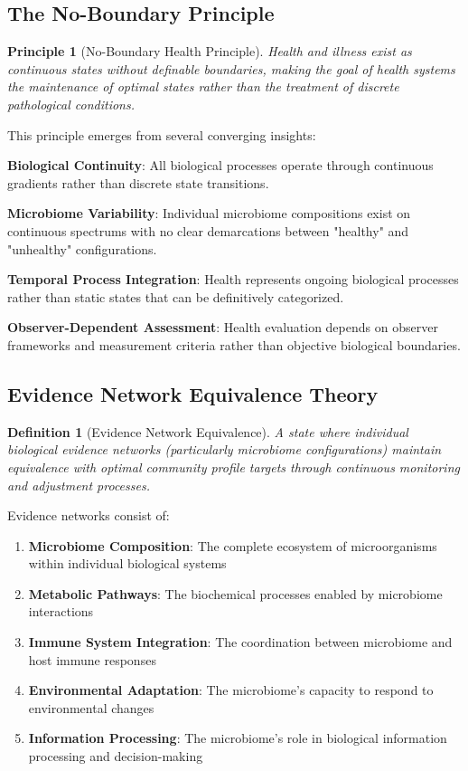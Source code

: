 \documentclass[12pt,a4paper]{article}
\newtheorem{definition}[theorem]{Definition}
\newtheorem{principle}[theorem]{Principle}
\begin{document}
\subsection{The No-Boundary Principle}

\begin{principle}[No-Boundary Health Principle]
Health and illness exist as continuous states without definable boundaries, making the goal of health systems the maintenance of optimal states rather than the treatment of discrete pathological conditions.
\end{principle}

This principle emerges from several converging insights:

\textbf{Biological Continuity}: All biological processes operate through continuous gradients rather than discrete state transitions.

\textbf{Microbiome Variability}: Individual microbiome compositions exist on continuous spectrums with no clear demarcations between "healthy" and "unhealthy" configurations.

\textbf{Temporal Process Integration}: Health represents ongoing biological processes rather than static states that can be definitively categorized.

\textbf{Observer-Dependent Assessment}: Health evaluation depends on observer frameworks and measurement criteria rather than objective biological boundaries.

\subsection{Evidence Network Equivalence Theory}

\begin{definition}[Evidence Network Equivalence]
A state where individual biological evidence networks (particularly microbiome configurations) maintain equivalence with optimal community profile targets through continuous monitoring and adjustment processes.
\end{definition}

Evidence networks consist of:

\begin{enumerate}
\item \textbf{Microbiome Composition}: The complete ecosystem of microorganisms within individual biological systems
\item \textbf{Metabolic Pathways}: The biochemical processes enabled by microbiome interactions
\item \textbf{Immune System Integration}: The coordination between microbiome and host immune responses  
\item \textbf{Environmental Adaptation}: The microbiome's capacity to respond to environmental changes
\item \textbf{Information Processing}: The microbiome's role in biological information processing and decision-making
\end{enumerate}
\end{document}
